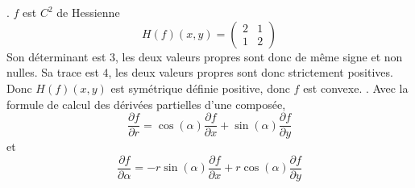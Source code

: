\documentclass{report}
\begin{document}
\subsection{} \noindent{}\\ 
\\ 
\\
. $f$ est $C^2$ de Hessienne $$H(f)(x,y)=\begin{pmatrix}
2 & 1\\
1 & 2
\end{pmatrix}$$
Son déterminant est $3$, les deux valeurs propres sont donc de même signe et non nulles. Sa trace est $4$, les deux valeurs propres sont donc strictement positives. Donc $H(f)(x,y)$ est symétrique définie positive, donc $f$ est convexe.\newline
{}. Avec la formule de calcul des dérivées partielles d'une composée, $$\frac{\partial f}{\partial r} = \cos(\alpha)\frac{\partial f}{\partial x} + \sin(\alpha)\frac{\partial f}{\partial y}$$
et 
$$\frac{\partial f}{\partial \alpha} = -r\sin(\alpha)\frac{\partial f}{\partial x} + r\cos(\alpha)\frac{\partial f}{\partial y}$$
\end{document}
